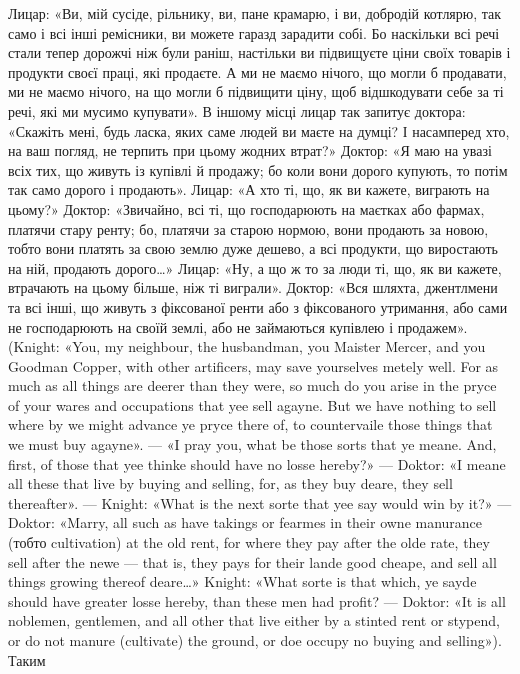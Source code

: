 {Лицар: «Ви, мій сусіде, рільнику, ви, пане крамарю, і ви, добродій
котлярю, так само і всі інші ремісники, ви можете гаразд зарадити
собі. Бо наскільки всі речі стали тепер дорожчі ніж були раніш, настільки
ви підвищуєте ціни своїх товарів і продукти своєї праці, які продаєте.
А ми не маємо нічого, що могли б продавати, ми не маємо нічого, на що
могли б підвищити ціну, щоб відшкодувати себе за ті речі, які ми мусимо
купувати». В іншому місці лицар так запитує доктора: «Скажіть мені,
будь ласка, яких саме людей ви маєте на думці? І насамперед хто, на
ваш погляд, не терпить при цьому жодних втрат?» Доктор: «Я маю на
увазі всіх тих, що живуть із купівлі й продажу; бо коли вони дорого
купують, то потім так само дорого і продають». Лицар: «А хто ті, що,
як ви кажете, виграють на цьому?» Доктор: «Звичайно, всі ті, що господарюють
на маєтках або фармах, платячи стару ренту; бо, платячи за старою
нормою, вони продають за новою, тобто вони платять за свою землю
дуже дешево, а всі продукти, що виростають на ній, продають дорого\dots{}»
Лицар: «Ну, а що ж то за люди ті, що, як ви кажете, втрачають на цьому
більше, ніж ті виграли». Доктор: «Вся шляхта, джентлмени та всі інші,
що живуть з фіксованої ренти або з фіксованого утримання, або сами
не господарюють на своїй землі, або не займаються купівлею і продажем».
(Knight: «You, my neighbour, the husbandman, you Maister Mercer,
and you Goodman Copper, with other artificers, may save yourselves
metely well. For as much as all things are deerer than they were, so much
do you arise in the pryce of your wares and occupations that yee sell agayne.
But we have nothing to sell where by we might advance ye pryce there of,
to countervaile those things that we must buy agayne». — «I pray you, what
be those sorts that ye meane. And, first, of those that yee thinke should
have no losse hereby?» — Doktor: «I meane all these that live by buying
and selling, for, as they buy deare, they sell thereafter». — Knight: «What
is the next sorte that yee say would win by it?» — Doktor: «Marry, all
such as have takings or fearmes in their owne manurance (тобто cultivation)
at the old rent, for where they pay after the olde rate, they sell after the newe — that is, they pays for their lande good cheape, and sell all things
growing thereof deare\dots{}» Knight: «What sorte is that which, ye sayde
should have greater losse hereby, than these men had profit? — Doktor:
«It is all noblemen, gentlemen, and all other that live either by a stinted
rent or stypend, or do not manure (cultivate) the ground, or doe occupy no
buying and selling»).
} Таким
